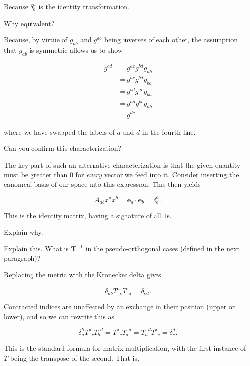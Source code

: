 \documentclass[../the-road-to-reality.tex]{subfiles}
\begin{document}
\begin{questions}
\begin{solution}
	Because $\delta^a_b$ is the identity transformation.
\end{solution}

\question Why equivalent?

\begin{solution}
	Because, by virtue of $g_{ab}$ and $g^{ab}$ being inverses of each other, the assumption that $g_{ab}$ is symmetric allows us to show

	\begin{align*}
		g^{cd} &= g^{ac}g^{bd}g_{ab} \\
		       &= g^{ac}g^{bd}g_{ba} \\
		       &= g^{bd}g^{ac}g_{ba} \\
		       &= g^{ad}g^{bc}g_{ab} \\
		       &= g^{dc}
	\end{align*}

	where we have swapped the labels of $a$ and $d$ in the fourth line.
\end{solution}

\question Can you confirm this characterization?

\begin{solution}
	The key part of such an alternative characterization is that the given quantity must be greater than $0$ for \textit{every} vector we feed into it. Consider inserting the canonical basis of our space into this expression. This then yields

	\[
		A_{ab}x^ax^b = \mathbf{e}_a \cdot \mathbf{e}_b = \delta^a_b
	.\]

	This is the identity matrix, having a signature of all $1$s.
\end{solution}

\question Explain why.

\question Explain this. What is $\mathbf{T}^{-1}$ in the pseudo-orthogonal cases (defined in the next paragraph)?

\begin{solution}
	Replacing the metric with the Kronecker delta gives

	\[
		\delta_{ab}{T^a}_c{T^b}_d = \delta_{cd}
	.\] 

	Contracted indices are unaffected by an exchange in their position (upper or lower), and so we can rewrite this as

	\[
		\delta_a^b{T^a}_c{T_b}^d = {T^a}_c{T_a}^d = {T_a}^d{T^a}_c = \delta_c^d
	.\] 

	This is the standard formula for matrix multiplication, with the first instance of $T$ being the transpose of the second. That is,


\end{solution}
\end{questions}
\end{document}
